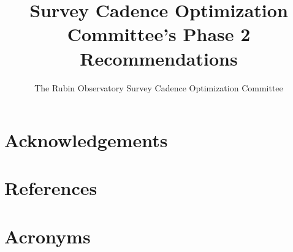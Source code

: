 \documentclass[PST,authoryear,toc]{lsstdoc}
\title{Survey Cadence Optimization Committee’s Phase 2 Recommendations}
\author{%
{The Rubin Observatory Survey Cadence Optimization Committee}}
\date{\vcsDate}
\begin{document}
\maketitle




\appendix
\section{Acknowledgements}

\section{References} \label{sec:bib}
\renewcommand{\refname}{} %


\section{Acronyms} \label{sec:acronyms}

\end{document}
